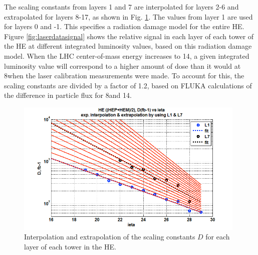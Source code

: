 The scaling constants from layers 1 and 7 are interpolated for layers 2-6 and extrapolated for layers 8-17, as shown in Fig. \ref{fig:laserdataconsts}.
The values from layer 1 are used for layers 0 and -1. This specifies a radiation damage model for the entire HE.
Figure \ref{fig:laserdatasignal} shows the relative signal in each layer of each tower of the HE at different integrated luminosity values, based on this radiation damage model. When the LHC center-of-mass energy increases to 14\TeV, a given integrated luminosity value will correspond to a higher amount of dose than it would at 8\TeV when the laser calibration measurements were made. To account for this, the scaling constants are divided by a factor of 1.2, based on FLUKA calculations of the difference in particle flux for 8\TeV and 14\TeV.

\begin{figure}[hbtp]
  \begin{center}
    \includegraphics[width=0.98\textwidth]{figures/laserdataconsts.png}
    \caption{Interpolation and extrapolation of the scaling constants $D$ for each layer of each tower in the HE.~\cite{epshteyn}}
    \label{fig:laserdataconsts}
  \end{center}
\end{figure}

